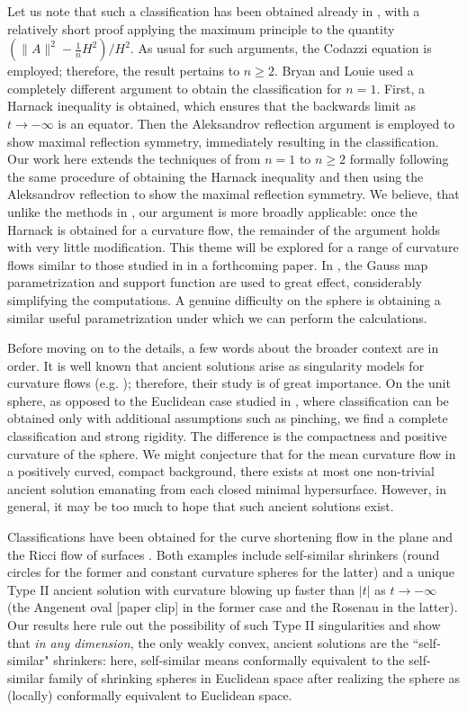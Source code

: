 \documentclass{amsart}
\theoremstyle{definition}
\theoremstyle{remark}
\numberwithin{equation}{section}
\begin{document}
Let us note that such a classification has been obtained already in \cite[Theorem 6.1]{Hu-Sin 2014}, with a relatively short proof applying the maximum principle to the quantity $(\|A\|^2 - \tfrac{1}{n}H^2)/H^2$. As usual for such arguments, the Codazzi equation is employed; therefore, the result pertains to $n\geq 2$. Bryan and Louie \cite{Br-Lou} used a completely different argument to obtain the classification for $n=1$. First, a Harnack inequality is obtained, which ensures that the backwards limit as $t \to -\infty$ is an equator. Then the Aleksandrov reflection argument is employed to show maximal reflection symmetry, immediately resulting in the classification. Our work here extends the techniques of \cite{Br-Lou} from $n=1$ to $n\geq 2$ formally following the same procedure of obtaining the Harnack inequality and then using the Aleksandrov reflection to show the maximal reflection symmetry. We believe, that unlike the methods in \cite{Hu-Sin 2014}, our argument is more broadly applicable: once the Harnack is obtained for a curvature flow, the remainder of the argument holds with very little modification. This theme will be explored for a range of curvature flows similar to those studied in \cite{Andrews 94} in a forthcoming paper. In \cite{Andrews 94}, the Gauss map parametrization and support function are used to great effect, considerably simplifying the computations. A genuine difficulty on the sphere is obtaining a similar useful parametrization under which we can perform the calculations.

Before moving on to the details, a few words about the broader context are in order. It is well known that ancient solutions arise as singularity models for curvature flows (e.g. \cite{Hu-Sin 1999}); therefore, their study is of great importance. On the unit sphere, as opposed to the Euclidean case studied in \cite{Hu-Sin 2014}, where classification can be obtained only with additional assumptions such as pinching, we find a complete classification and strong rigidity. The difference is the compactness and positive curvature of the sphere. We might conjecture that for the mean curvature flow in a positively curved, compact background, there exists at most one non-trivial ancient solution emanating from each closed minimal hypersurface. However, in general, it may be too much to hope that such ancient solutions exist.

Classifications have been obtained for the curve shortening flow in the plane \cite{Da-Ham-Sesu 2010} and the Ricci flow of surfaces \cite{Da-Ham-Sesu 2012}. Both examples include self-similar shrinkers (round circles for the former and constant curvature spheres for the latter) and a unique Type II ancient solution with curvature blowing up faster than $|t|$ as $t\to-\infty$ (the Angenent oval [paper clip] in the former case and the Rosenau in the latter). Our results here rule out the possibility of such Type II singularities and show that \emph{in any dimension}, the only weakly convex, ancient solutions are the ``self-similar" shrinkers: here, self-similar means conformally equivalent to the self-similar family of shrinking spheres in Euclidean space after realizing the sphere as (locally) conformally equivalent to Euclidean space.
\end{document}
